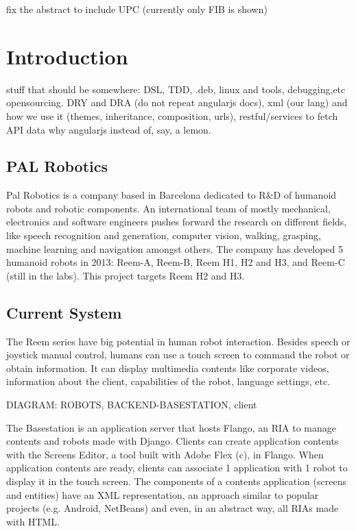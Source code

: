 
fix the abstract to include UPC (currently only FIB is shown)
\cite{Darwin} \cite{Crockford} \cite{Stefanov} \cite{AngularJSGuide} \cite{Fowler}


\chapter{Introduction}
stuff that should be somewhere: DSL, TDD, .deb, linux and tools, debugging,etc opensourcing. DRY and DRA (do not repeat angularjs docs), xml (our lang) and how we use it (themes, inheritance, composition, urls), restful/services to fetch API data
why angularjs instead of, say, a lemon.

\section{PAL Robotics}
Pal Robotics is a company based in Barcelona dedicated to R\&D of humanoid robots and robotic components. 
An international team of mostly mechanical, electronics and software engineers pushes forward the research on different fields, like speech recognition and generation, computer vision, walking, grasping, machine learning and navigation amongst others.
The company has developed 5 humanoid robots in 2013: Reem-A, Reem-B, Reem H1, H2 and H3, and Reem-C (still in the labs).
This project targets Reem H2 and H3.

\section{Current System}
The Reem series have big potential in human robot interaction. 
Besides speech or joystick manual control, humans can use a touch screen to command the robot or obtain information.
It can display multimedia contents like corporate videos, information about the client, capabilities of the robot, language settings, etc.

DIAGRAM: ROBOTS, BACKEND-BASESTATION, client

The Basestation is an application server that hosts Flango, an \ac{RIA} to manage contents and robots made with Django. 
Clients can create application contents with the Screens Editor, a tool built with Adobe Flex (c), in Flango.
When application contents are ready, clients can associate 1 application with 1 robot to display it in the touch screen.
The components of a contents application (screens and entities) have an \ac{XML} representation, an approach similar to popular projects (e.g. Android, NetBeans) and even, in an abstract way, all \acp{RIA} made with \ac{HTML}.

